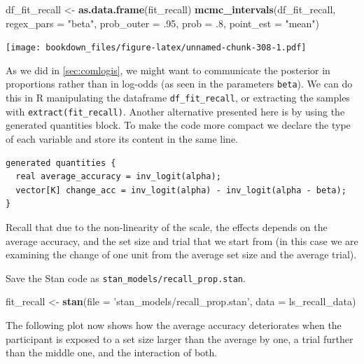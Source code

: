 \documentclass[12pt,]{krantz}
\newenvironment{Shaded}{\begin{snugshade}}{\end{snugshade}}
\newcommand{\KeywordTok}[1]{\textcolor[rgb]{0.13,0.29,0.53}{\textbf{#1}}}
\newcommand{\DataTypeTok}[1]{\textcolor[rgb]{0.13,0.29,0.53}{#1}}
\newcommand{\FloatTok}[1]{\textcolor[rgb]{0.00,0.00,0.81}{#1}}
\newcommand{\StringTok}[1]{\textcolor[rgb]{0.31,0.60,0.02}{#1}}
\newcommand{\NormalTok}[1]{#1}
\theoremstyle{definition}
\theoremstyle{definition}
\theoremstyle{definition}
\theoremstyle{remark}
\begin{document}
\begin{Shaded}
\begin{Highlighting}[]
\NormalTok{df_fit_recall <-}\StringTok{ }\KeywordTok{as.data.frame}\NormalTok{(fit_recall)}
\KeywordTok{mcmc_intervals}\NormalTok{(df_fit_recall,}
               \DataTypeTok{regex_pars =}  \StringTok{"beta"}\NormalTok{,}
               \DataTypeTok{prob_outer =} \FloatTok{.95}\NormalTok{,}
               \DataTypeTok{prob =} \FloatTok{.8}\NormalTok{,}
               \DataTypeTok{point_est =} \StringTok{"mean"}\NormalTok{)}
\end{Highlighting}
\end{Shaded}

\texttt{[image: bookdown\_files/figure-latex/unnamed-chunk-308-1.pdf]}

As we did in \ref{sec:comlogis}, we might want to communicate the
posterior in proportions rather than in log-odds (as seen in the
parameters \texttt{beta}). We can do this in R manipulating the
dataframe \texttt{df\_fit\_recall}, or extracting the samples with
\texttt{extract(fit\_recall)}. Another alternative presented here is by
using the generated quantities block. To make the code more compact we
declare the type of each variable and store its content in the same
line.

\begin{verbatim}
generated quantities {
  real average_accuracy = inv_logit(alpha);
  vector[K] change_acc = inv_logit(alpha) - inv_logit(alpha - beta);
}
\end{verbatim}

Recall that due to the non-linearity of the scale, the effects depends
on the average accuracy, and the set size and trial that we start from
(in this case we are examining the change of one unit from the average
set size and the average trial).

Save the Stan code as \texttt{stan\_models/recall\_prop.stan}.

\begin{Shaded}
\begin{Highlighting}[]
\NormalTok{fit_recall <-}\StringTok{ }\KeywordTok{stan}\NormalTok{(}\DataTypeTok{file =} \StringTok{'stan_models/recall_prop.stan'}\NormalTok{,}
                   \DataTypeTok{data =}\NormalTok{ ls_recall_data) }
\end{Highlighting}
\end{Shaded}

The following plot now shows how the average accuracy deteriorates when
the participant is exposed to a set size larger than the average by one,
a trial further than the middle one, and the interaction of both.
\end{document}
